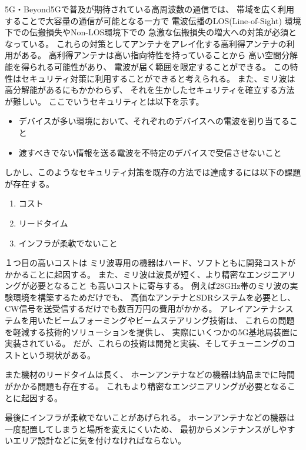 \documentclass[technicalreport]{ieicej}
\begin{document}
5G・Beyond5Gで普及が期待されている高周波数の通信では、
帯域を広く利用することで大容量の通信が可能となる一方で
電波伝播のLOS(Line-of-Sight)
環境下での伝搬損失やNon-LOS環境下での
急激な伝搬損失の増大への対策が必須となっている。
これらの対策としてアンテナをアレイ化する高利得アンテナの利用がある。
高利得アンテナは高い指向特性を持っていることから
高い空間分解能を得られる可能性があり、
電波が届く範囲を限定することができる。
この特性はセキュリティ対策に利用することができると考えられる。
また、ミリ波は高分解能があるにもかかわらず、
それを生かしたセキュリティを確立する方法が難しい。
ここでいうセキュリティとは以下を示す。

\begin{itemize}
  \item デバイスが多い環境において、それぞれのデバイスへの電波を割り当てること
  \item 渡すべきでない情報を送る電波を不特定のデバイスで受信させないこと
\end{itemize}

しかし、このようなセキュリティ対策を既存の方法では達成するには以下の課題が存在する。

\begin{enumerate}
  \item コスト
  \item リードタイム
  \item インフラが柔軟でないこと
\end{enumerate}

１つ目の高いコストは
ミリ波専用の機器はハード、ソフトともに開発コストがかかることに起因する。
また、ミリ波は波長が短く、より精密なエンジニアリングが必要となること
も高いコストに寄与する。
例えば28GHz帯のミリ波の実験環境を構築するためだけでも、
高価なアンテナとSDRシステムを必要とし、
CW信号を送受信するだけでも数百万円の費用がかかる\cite{zep}。
アレイアンテナシステムを用いたビームフォーミングやビームステアリング技術は、
これらの問題を軽減する技術的ソリューションを提供し、
実際にいくつかの5G基地局装置に実装されている。
だが、これらの技術は開発と実装、そしてチューニングのコストという現状がある。

また機材のリードタイムは長く、
ホーンアンテナなどの機器は納品までに時間がかかる問題も存在する。
これもより精密なエンジニアリングが必要となることに起因する。

最後にインフラが柔軟でないことがあげられる。
ホーンアンテナなどの機器は一度配置してしまうと場所を変えにくいため、
最初からメンテナンスがしやすいエリア設計などに気を付けなければならない。
\end{document}
